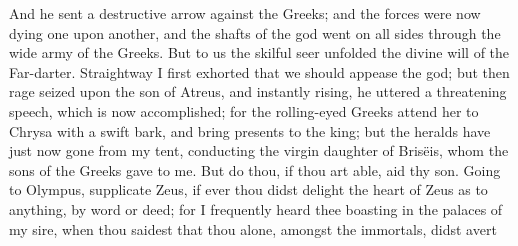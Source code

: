 \documentclass{ransom}
\begin{document}
And he sent a destructive arrow against the Greeks; and the forces
were now dying one upon another, and the shafts of the god went on all
sides through the wide army of the Greeks. But to us the skilful seer
unfolded the divine will of the Far-darter. Straightway I first
exhorted that we should appease the god; but then rage seized upon the
son of Atreus, and instantly rising, he uttered a threatening speech,
which is now accomplished; for the rolling-eyed Greeks attend her to
Chrysa with a swift bark, and bring presents to the king; but the
heralds have just now gone from my tent, conducting the virgin daughter
of Brisëis, whom the sons of the Greeks gave to me. But do thou, if
thou art able, aid thy son. Going to Olympus, supplicate Zeus, if ever
thou didst delight the heart of Zeus as to anything, by word or deed;
for I frequently heard thee boasting in the palaces of my sire, when
thou saidest that thou alone, amongst the immortals, didst avert
\end{document}
